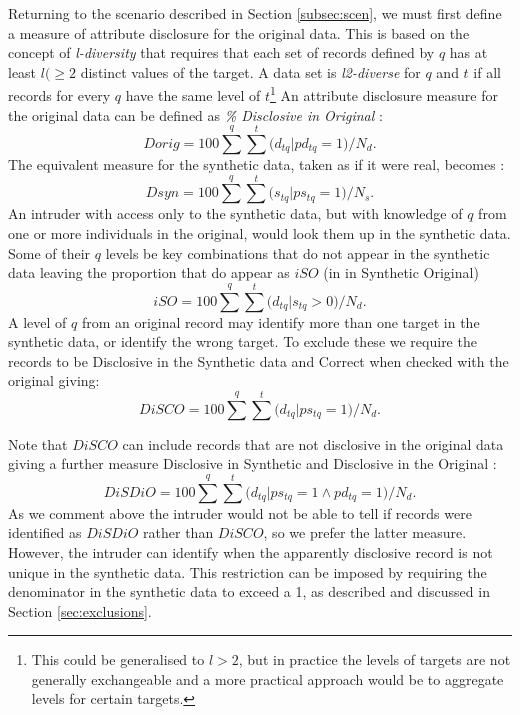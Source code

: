 \documentclass[12pt]{article}
\begin{document}
Returning to the scenario described in Section \ref{subsec:scen}, we must first define a measure of attribute disclosure for the original data. This is based on the concept of \textit{l-diversity} \cite{ldiv} that requires that each set of records defined by $q$ has at least $l(\ge{2}$ distinct values of the target. A data set is \textit{l2-diverse} for $q$ and $t$ if all records for every $q$ have the same level of $t$\footnote{This could be generalised to $l>2$, but in practice the levels of targets are not generally exchangeable and a more practical approach would be to aggregate levels for certain targets.} An attribute disclosure measure for the original data can be defined as \textit{\% Disclosive in Original} :
\begin{equation}
 Dorig = 100\sum^q{\sum^t{(d_{tq} |pd_{tq} = 1})}/N_d.
\end{equation}
The equivalent measure for the synthetic data, taken as if it were real, becomes :
\begin{equation}
 Dsyn = 100\sum^q{\sum^t{(s_{tq} |ps_{tq} = 1})}/N_s.
\end{equation}
An intruder with access only to the synthetic data, but with knowledge of $q$ from one or more individuals in the original, would look them up in the synthetic data. Some of their $q$ levels be key combinations that do not appear in the synthetic data
leaving the proportion that do appear as $iSO$ (in in Synthetic Original) 
\begin{equation}
 iSO = 100\sum^q{\sum^t{(d_{tq} | s_{tq}>0} )}/N_d.
\end{equation}
A level of $q$ from an original record may identify more than one target in the synthetic data, or identify the wrong target.
To exclude these we require the records to be Disclosive in  the Synthetic data and Correct when checked 
with the original giving:
\begin{equation}
 DiSCO = 100\sum^q{\sum^t{(d_{tq} | ps_{tq} = 1}  )}/N_d.
\end{equation}

Note that $DiSCO$ can include records that are not disclosive in the original data giving a further 
measure Disclosive in Synthetic and Disclosive in the  Original :
\begin{equation}
DiSDiO = 100\sum^q{\sum^t{(d_{tq} | ps_{tq} = 1 \land pd_{tq} = 1}  ) }/N_d.
  \end{equation}
As we comment above the intruder would not be able to tell if records were 
identified as $DiSDiO$ rather than $DiSCO$, so we prefer the latter measure.
However, the intruder can identify when the apparently disclosive record
is not unique in the synthetic data. 
 This restriction can be imposed by requiring the denominator in the synthetic data to exceed a 1, as described
 and discussed in Section \ref{sec:exclusions}.
\end{document}
